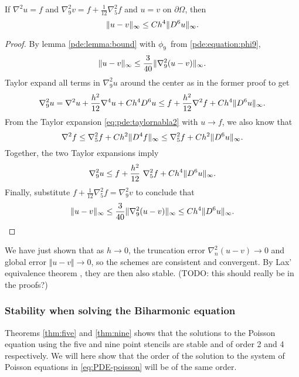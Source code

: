 \begin{theorem}\label{thm:nine}
If $\nabla^2 u = f$ and $\nabla_9^2 v = f + \frac{1}{12} \nabla_5^2 f$ and $u = v$ on $\partial \Omega$, then
$$
\lVert u - v \rVert_\infty \leq C h^4 \lVert D^6 u \rVert_\infty.
$$
\end{theorem}
\begin{proof}
By lemma \ref{pde:lemma:bound} with $\phi_9$ from \ref{pde:equation:phi9},
$$
\lVert u - v \rVert_\infty \leq \frac{3}{40} \lVert \nabla_9^2 (u  - v) \rVert_\infty.
$$
Taylor expand all terms in $\nabla_9^2 u$ around the center as in the former proof to get
\begin{equation*}
\nabla_9^2 u = \nabla^2 u + \frac{h^2}{12} \nabla^4 u + Ch^4 D^6 u \leq f + \frac{h^2}{12} \nabla^2 f + Ch^4 \lVert D^6 u \rVert_\infty.
\end{equation*}
From the Taylor expansion \ref{eq:pde:taylornabla2} with $u \rightarrow f$, we also know that
\begin{equation*}
\nabla^2 f \leq \nabla_5^2 f + Ch^2 \lVert D^4 f \rVert_\infty \leq \nabla_5^2 f + Ch^2 \lVert D^6 u \rVert_\infty.
\end{equation*}
Together, the two Taylor expansions imply
\begin{equation*}
	\nabla_9^2 u \leq f + \frac{h^2}{12} \nabla_5^2 f + Ch^4 \inorm{D^6 u}.
\end{equation*}
Finally, substitute $f + \frac{1}{12} \nabla_5^2 f = \nabla_9^2 v$ to conclude that
\begin{equation*}
  \lVert u-v \rVert_\infty \leq \frac{3}{40} \lVert \nabla_9^2 (u - v) \rVert_\infty \leq C h^4 \lVert D^6 u \rVert_\infty. \qedhere
\end{equation*}
\end{proof}

We have just shown that as $h \rightarrow 0$, the truncation error $\nabla_n^2 (u - v) \rightarrow 0$ and global error $\Vert u - v \Vert \rightarrow 0$, so the schemes are consistent and convergent.
By Lax' equivalence theorem \cite{owren}, they are then also stable.
(TODO: this should really be in the proofs?)

\subsubsection{Stability when solving the Biharmonic equation}
Theorems \ref{thm:five} and \ref{thm:nine} shows that the solutions to the Poisson equation using the five and nine point stencils are stable and of order 2 and 4 respectively.
We will here show that the order of the solution to the system of Poisson equations in \eqref{eq:PDE-poisson} will be of the same order.


